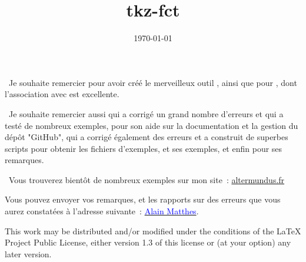 \documentclass[DIV         = 14,
               fontsize    = 10,
               headinclude = false,
               index       = totoc,
               footinclude = false,
               twoside,
               headings    = small
               ]{tkz-doc}
\gdef\tkznameofpack{tkz-fct}
\begin{document}
\title{\tkznameofpack}
\date{\today}
\clearpage
\thispagestyle{empty}
\maketitle

\clearpage

\nameoffile{\tkznameofpack}


\presentation

\vspace*{24pt}
\noindent\lefthand\ Je souhaite remercier  pour avoir créé le merveilleux outil \tkzname{\TIKZ}, ainsi que  pour , dont l'association avec  est excellente.


\vspace*{12pt}
\noindent\lefthand\ Je souhaite remercier aussi   qui a corrigé un grand nombre d'erreurs et qui a testé de nombreux exemples,  pour son aide sur la documentation et la gestion du dépôt "GitHub",  qui a corrigé également des erreurs et a construit de superbes scripts pour obtenir les fichiers d'exemples,    et ses exemples, et enfin   pour ses remarques.

\vspace*{12pt}
\noindent\lefthand\ Vous trouverez bientôt de nombreux exemples sur mon site~:
\href{http://altermundus.fr}{altermundus.fr}

\vfill
Vous pouvez envoyer vos remarques, et les rapports sur des erreurs que vous aurez constatées à l'adresse suivante~: \href{mailto:al.ma@mac.com}{\textcolor{blue}{Alain Matthes}}.

This work may be distributed and/or modified under the
conditions of the LaTeX Project Public License, either version 1.3
of this license or (at your option) any later version.
\end{document}
